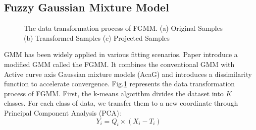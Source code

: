 \documentclass[conference]{IEEEtran}
\begin{document}
\subsection{Fuzzy Gaussian Mixture Model}
\begin{figure}[!t]
    \centering
    \caption{The data transformation process of FGMM. (a) Original Samples (b) Transformed Samples (c) Projected Samples}
    \label{fig2}
\end{figure}
GMM has been widely applied in various fitting scenarios\cite{Chen2020a, Chen2021a, Mei2023}. Paper \cite{Ju2012} introduce a modified GMM called the FGMM. It combines the conventional GMM with Active curve axis Gaussian mixture models (AcaG)\cite{Zhang2005} and introduces a dissimilarity function to accelerate convergence. Fig.\ref{fig2} represents the data transformation process of FGMM. First, the k-means algorithm divides the dataset into $K$ classes. For each class of data, we transfer them to a new coordinate through Principal Component Analysis (PCA):
\begin{equation}
    Y_i=Q_i \times (X_i-T_i)
\end{equation}
\end{document}
